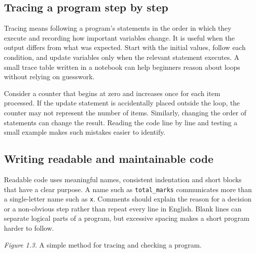 \documentclass[11pt,openany,oneside]{book}
\begin{document}
\subsection{Tracing a program step by step}
Tracing means following a program's statements in the order in which they execute and recording how important variables change. It is useful when the output differs from what was expected. Start with the initial values, follow each condition, and update variables only when the relevant statement executes. A small trace table written in a notebook can help beginners reason about loops without relying on guesswork.

Consider a counter that begins at zero and increases once for each item processed. If the update statement is accidentally placed outside the loop, the counter may not represent the number of items. Similarly, changing the order of statements can change the result. Reading the code line by line and testing a small example makes such mistakes easier to identify.

\subsection{Writing readable and maintainable code}
Readable code uses meaningful names, consistent indentation and short blocks that have a clear purpose. A name such as \texttt{total\_marks} communicates more than a single-letter name such as \texttt{x}. Comments should explain the reason for a decision or a non-obvious step rather than repeat every line in English. Blank lines can separate logical parts of a program, but excessive spacing makes a short program harder to follow.

\begin{center}
\end{center}
\textit{Figure 1.3.} A simple method for tracing and checking a program.
\end{document}
